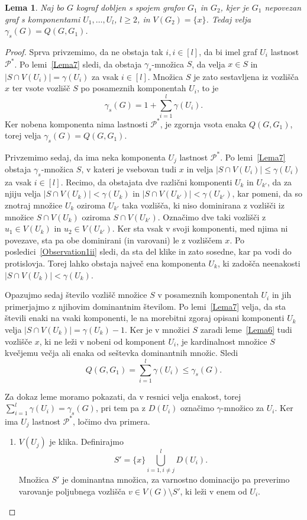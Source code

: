 \documentclass[12pt,a4paper,twoside]{article}
\theoremstyle{definition} %
\theoremstyle{plain} %
\newtheorem{lema}[definicija]{Lema}
\numberwithin{equation}{section}  %
\begin{document}
\begin{lema}\label{Lema8}
Naj bo $G$ kograf dobljen s spojem grafov $G_1$ in $G_2$, kjer je $G_1$ nepovezan graf s komponentami $U_1, \dots, U_l$, $l \geq 2$, in  $V(G_2) = \{x\}$. Tedaj velja $\gamma_s(G) = Q(G, G_1)$.
\end{lema}
\begin{proof}
Sprva privzemimo, da ne obstaja tak $i, i \in [l]$, da bi imel graf $U_i$ lastnost $\mathcal{P^*}$. Po lemi~\ref{Lema7} sledi, da obstaja $\gamma_s$-množica $S$, da velja $x\in S$ in $|S \cap V(U_i)| = \gamma(U_i)$ za vsak $i \in [l]$. Množica $S$ je zato sestavljena iz vozlišča $x$ ter vsote vozlišč $S$ po posameznih komponentah $U_i$, to je $$\gamma_s(G) = 1 + \sum\limits_{i=1}^l\gamma(U_i).$$ Ker nobena komponenta nima lastnosti $\mathcal{P^*}$, je zgornja vsota enaka $Q(G, G_1)$, torej velja $\gamma_s(G) = Q(G, G_1)$.

Privzemimo sedaj, da ima neka komponenta $U_j$ lastnost $\mathcal{P^*}$. Po lemi~\ref{Lema7} obstaja $\gamma_s$-množica $S$, v kateri je vsebovan tudi $x$ in velja $|S \cap V(U_i)| \leq \gamma(U_i)$ za vsak $i \in [l]$. Recimo, da obstajata dve različni komponenti $U_k$ in $U_{k'}$, da za njiju velja  $|S \cap V(U_k)| < \gamma(U_k)$ in $|S \cap V(U_{k'})| < \gamma(U_{k'})$, kar pomeni, da so znotraj množice $U_k$ oziroma $U_{k'}$ taka vozlišča, ki niso dominirana z vozlišči iz množice $S \cap V(U_k)$ oziroma $S \cap V(U_{k'})$. Označimo dve taki vozlišči z $u_1\in V(U_k)$ in $u_2 \in V(U_{k'})$. Ker sta vsak v svoji komponenti, med njima ni povezave, sta pa obe dominirani (in varovani) le z vozliščem $x$. Po posledici~\ref{Observation1ii} sledi, da sta del klike in zato sosedne, kar pa vodi do protislovja. Torej lahko obstaja največ ena komponenta $U_k$, ki zadošča neenakosti $|S \cap V(U_k)| < \gamma(U_k)$.

Opazujmo sedaj število vozlišč množice $S$ v posameznih komponentah $U_i$ in jih primerjajmo z njihovim dominantnim številom. Po lemi~\ref{Lema7} velja, da sta števili enaki na vsaki komponenti, le na morebitni zgoraj opisani komponenti $U_k$ velja $|S \cap V(U_k)| = \gamma(U_k) - 1$. Ker je v množici $S$ zaradi leme~\ref{Lema6} tudi vozlišče $x$, ki ne leži v nobeni od komponent $U_i$, je kardinalnost množice $S$ kvečjemu večja ali enaka od seštevka dominantnih množic. Sledi $$Q(G, G_1) = \sum\limits_{i = 1}^l\gamma(U_i) \leq \gamma_s(G).$$

Za dokaz leme moramo pokazati, da v resnici velja enakost, torej $\sum_{i = 1}^l\gamma(U_i) = \gamma_s(G)$, pri tem pa z $D(U_i)$ označimo $\gamma$-množico za $U_i$. Ker ima $U_j$ lastnost $\mathcal{P^*}$, ločimo dva primera.
\begin{enumerate}[label=($\roman*$)]
\item $V(U_j)$ je klika. Definirajmo $$S' = \{x\} \bigcup\limits_{i = 1, i \neq j}^l D(U_i).$$
Množica $S'$ je dominantna množica, za varnostno dominacijo pa preverimo varovanje poljubnega vozlišča $v \in V(G) \setminus S'$, ki leži v enem od $U_i$.


\end{enumerate}
\end{proof}
\end{document}
